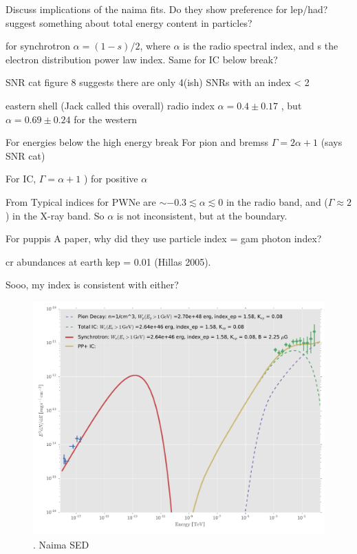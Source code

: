 Discuss implications of the naima fits. Do they show preference for lep/had? suggest something about total energy content in particles?

for synchrotron $\alpha = (1-s)/2$, where $\alpha$ is the radio spectral index, and s the electron distribution power law index. Same for IC below break?

SNR cat figure 8 suggests there are only 4(ish) SNRs with an index < 2

eastern shell (Jack called this overall) radio index $\alpha = 0.4 \pm 0.17$  \cite{Gao14}, but $\alpha = 0.69 \pm 0.24$ for the western

For energies below the high energy break
For pion and bremss $\Gamma = 2\alpha + 1$ (says SNR cat)

For IC, $\Gamma = \alpha + 1 $ ) for positive $\alpha$

From \cite{Gaensler06} Typical indices for PWNe are $\sim -0.3 \lesssim \alpha  \lesssim  0$ in the radio band, and ($\Gamma \approx 2$) in the X-ray band. So $\alpha$ is not inconsistent, but at the boundary.

For puppis A paper, why did they use particle index = gam photon index?

cr abundances at earth kep = 0.01  (Hillas 2005).

Sooo, my index is consistent with either?
\begin{figure}[!ht]
	\begin{centering}
		\includegraphics[width=\columnwidth]{Figures/G150_ICsync_PP_SED.pdf}
		\caption{ \Gone. Naima SED }
			\label{fig:naimaSED}
	\end{centering}
\end{figure}

